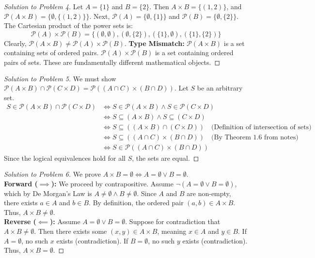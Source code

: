 \documentclass[11pt]{article}
\begin{document}
\begin{proof}[Solution to Problem 4]
Let $A = \{1\}$ and $B = \{2\}$. 
Then $A \times B = \{(1,2)\}$, and $\mathcal{P}(A \times B) = \{\emptyset, \{(1,2)\}\}$.
Next, $\mathcal{P}(A) = \{\emptyset, \{1\}\}$ and $\mathcal{P}(B) = \{\emptyset, \{2\}\}$.
The Cartesian product of the power sets is:
\[ \mathcal{P}(A) \times \mathcal{P}(B) = \{(\emptyset, \emptyset), (\emptyset, \{2\}), (\{1\}, \emptyset), (\{1\}, \{2\})\} \]
Clearly, $\mathcal{P}(A \times B) \neq \mathcal{P}(A) \times \mathcal{P}(B)$. 
\textbf{Type Mismatch:} $\mathcal{P}(A \times B)$ is a set containing sets of ordered pairs. $\mathcal{P}(A) \times \mathcal{P}(B)$ is a set containing ordered pairs of sets. These are fundamentally different mathematical objects.
\end{proof}

\begin{proof}[Solution to Problem 5]
We must show $\mathcal{P}(A \times B) \cap \mathcal{P}(C \times D) = \mathcal{P}((A \cap C) \times (B \cap D))$.
Let $S$ be an arbitrary set.
\begin{align*}
S \in \mathcal{P}(A \times B) \cap \mathcal{P}(C \times D) &\iff S \in \mathcal{P}(A \times B) \land S \in \mathcal{P}(C \times D) \\
&\iff S \subseteq (A \times B) \land S \subseteq (C \times D) \\
&\iff S \subseteq ((A \times B) \cap (C \times D)) \quad \text{(Definition of intersection of sets)} \\
&\iff S \subseteq ((A \cap C) \times (B \cap D)) \quad \text{(By Theorem 1.6 from notes)} \\
&\iff S \in \mathcal{P}((A \cap C) \times (B \cap D))
\end{align*}
Since the logical equivalences hold for all $S$, the sets are equal.
\end{proof}

\begin{proof}[Solution to Problem 6]
We prove $A \times B = \emptyset \iff A = \emptyset \lor B = \emptyset$. \\
\textbf{Forward ($\implies$):} We proceed by contrapositive. Assume $\neg(A = \emptyset \lor B = \emptyset)$, which by De Morgan's Law is $A \neq \emptyset \land B \neq \emptyset$. Since $A$ and $B$ are non-empty, there exists $a \in A$ and $b \in B$. By definition, the ordered pair $(a,b) \in A \times B$. Thus, $A \times B \neq \emptyset$. \\
\textbf{Reverse ($\impliedby$):} Assume $A = \emptyset \lor B = \emptyset$. Suppose for contradiction that $A \times B \neq \emptyset$. Then there exists some $(x,y) \in A \times B$, meaning $x \in A$ and $y \in B$. If $A = \emptyset$, no such $x$ exists (contradiction). If $B = \emptyset$, no such $y$ exists (contradiction). Thus, $A \times B = \emptyset$.
\end{proof}
\end{document}
